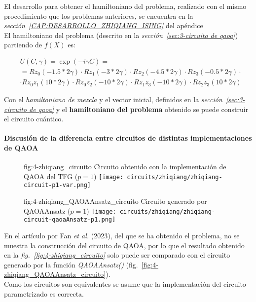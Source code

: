 El desarrollo para obtener el hamiltoniano del problema, realizado con el mismo procedimiento que los problemas anteriores, se encuentra en la \textit{sección~\ref{CAP:DESARROLLO_ZHIQIANG_ISING}} del apéndice
\\
El hamiltoniano del problema (descrito en la \textit{sección~\ref{sec:3-circuito de qaoa}}) partiendo de $f(X)$ es:

\begin{align}
  &U(C, \gamma) = \exp(-i \gamma C) = \nonumber \\
  &= Rz_0(-1.5 * 2\gamma) \cdot Rz_1(-3 * 2\gamma) \cdot Rz_2(-4.5 * 2\gamma) \cdot Rz_3(-0.5 * 2\gamma) \cdot \nonumber \\
  &\cdot Rz_0z_1(10 * 2\gamma) \cdot Rz_0z_2(-10 * 2\gamma) \cdot Rz_1z_3(-10 * 2\gamma) \cdot Rz_2z_3(10 * 2\gamma)
\end{align}

Con el \textit{hamiltoniano de mezcla} y el vector inicial, definidos en la \textit{sección~\ref{sec:3-circuito de qaoa}} y el \textbf{hamiltoniano del problema} obtenido se puede construir el circuito cuántico.

\paragraph{Discusión de la diferencia entre circuitos de distintas implementaciones de QAOA}

\begin{figure}[Circuito {--} shortest path de Fan \textit{et al.} (2023) propio]{fig:4-zhiqiang_circuito}{ Circuito obtenido con la implementación de QAOA del TFG ($p=1$) }
  \centering
  \texttt{[image: circuits/zhiqiang/zhiqiang-circuit-p1-var.png]}
\end{figure}

\begin{figure}[Circuito {--} shortest path de Fan \textit{et al.} (2023) de QAOAAnsatz]{fig:4-zhiqiang_QAOAAnsatz_circuito}{ Circuito generado por QAOAAnsatz ($p=1$) }
  \centering
  \texttt{[image: circuits/zhiqiang/zhiqiang-circuit-qaoaAnsatz-p1.png]}
\end{figure}

En el artículo por Fan \textit{et al.} (2023)\cite{solving_shortest_path_with_qaoa}, del que se ha obtenido el problema, no se muestra la construcción del circuito de QAOA, por lo que el resultado obtenido en la \textit{fig.~\ref{fig:4-zhiqiang_circuito}} solo puede ser comparado con el circuito generado por la función \textit{QAOAAnsatz()} (fig.~\ref{fig:4-zhiqiang_QAOAAnsatz_circuito}).
\\
Como los circuitos son equivalentes se asume que la implementación del circuito parametrizado es correcta.


